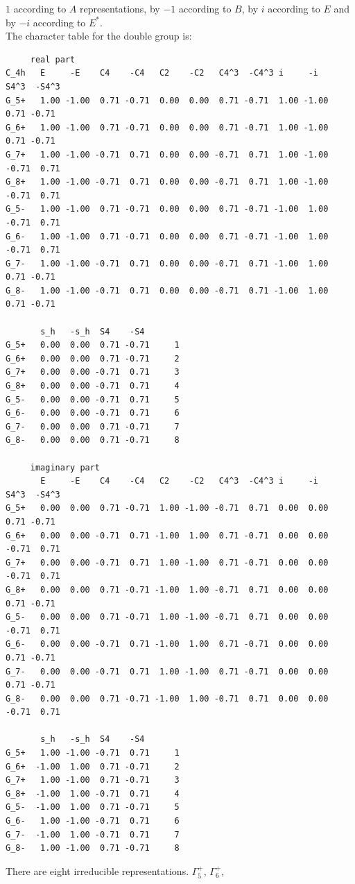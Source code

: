 \documentclass[12pt,a4paper]{article}
\begin{document}
$1$ according to $A$ representations, by $-1$ according to $B$,
by $i$ according to $E$ and by $-i$ according to $E^*$. \\
The character table for the double group is:
\begin{verbatim}
     real part
C_4h   E     -E    C4    -C4   C2    -C2   C4^3  -C4^3 i     -i    S4^3  -S4^3
G_5+   1.00 -1.00  0.71 -0.71  0.00  0.00  0.71 -0.71  1.00 -1.00  0.71 -0.71
G_6+   1.00 -1.00  0.71 -0.71  0.00  0.00  0.71 -0.71  1.00 -1.00  0.71 -0.71
G_7+   1.00 -1.00 -0.71  0.71  0.00  0.00 -0.71  0.71  1.00 -1.00 -0.71  0.71
G_8+   1.00 -1.00 -0.71  0.71  0.00  0.00 -0.71  0.71  1.00 -1.00 -0.71  0.71
G_5-   1.00 -1.00  0.71 -0.71  0.00  0.00  0.71 -0.71 -1.00  1.00 -0.71  0.71
G_6-   1.00 -1.00  0.71 -0.71  0.00  0.00  0.71 -0.71 -1.00  1.00 -0.71  0.71
G_7-   1.00 -1.00 -0.71  0.71  0.00  0.00 -0.71  0.71 -1.00  1.00  0.71 -0.71
G_8-   1.00 -1.00 -0.71  0.71  0.00  0.00 -0.71  0.71 -1.00  1.00  0.71 -0.71

       s_h   -s_h  S4    -S4  
G_5+   0.00  0.00  0.71 -0.71     1
G_6+   0.00  0.00  0.71 -0.71     2
G_7+   0.00  0.00 -0.71  0.71     3
G_8+   0.00  0.00 -0.71  0.71     4
G_5-   0.00  0.00 -0.71  0.71     5
G_6-   0.00  0.00 -0.71  0.71     6
G_7-   0.00  0.00  0.71 -0.71     7
G_8-   0.00  0.00  0.71 -0.71     8

     imaginary part
       E     -E    C4    -C4   C2    -C2   C4^3  -C4^3 i     -i    S4^3  -S4^3
G_5+   0.00  0.00  0.71 -0.71  1.00 -1.00 -0.71  0.71  0.00  0.00  0.71 -0.71
G_6+   0.00  0.00 -0.71  0.71 -1.00  1.00  0.71 -0.71  0.00  0.00 -0.71  0.71
G_7+   0.00  0.00 -0.71  0.71  1.00 -1.00  0.71 -0.71  0.00  0.00 -0.71  0.71
G_8+   0.00  0.00  0.71 -0.71 -1.00  1.00 -0.71  0.71  0.00  0.00  0.71 -0.71
G_5-   0.00  0.00  0.71 -0.71  1.00 -1.00 -0.71  0.71  0.00  0.00 -0.71  0.71
G_6-   0.00  0.00 -0.71  0.71 -1.00  1.00  0.71 -0.71  0.00  0.00  0.71 -0.71
G_7-   0.00  0.00 -0.71  0.71  1.00 -1.00  0.71 -0.71  0.00  0.00  0.71 -0.71
G_8-   0.00  0.00  0.71 -0.71 -1.00  1.00 -0.71  0.71  0.00  0.00 -0.71  0.71

       s_h   -s_h  S4    -S4  
G_5+   1.00 -1.00 -0.71  0.71     1
G_6+  -1.00  1.00  0.71 -0.71     2
G_7+   1.00 -1.00  0.71 -0.71     3
G_8+  -1.00  1.00 -0.71  0.71     4
G_5-  -1.00  1.00  0.71 -0.71     5
G_6-   1.00 -1.00 -0.71  0.71     6
G_7-  -1.00  1.00 -0.71  0.71     7
G_8-   1.00 -1.00  0.71 -0.71     8

\end{verbatim}
There are eight irreducible representations. $\Gamma_5^+$, $\Gamma_6^+$,
\end{document}
